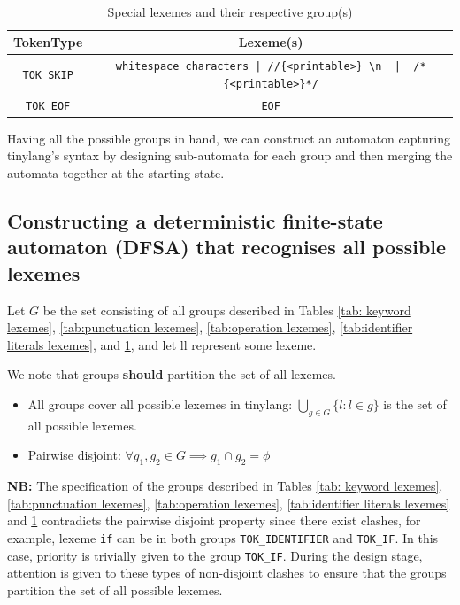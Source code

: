 \begin{itemize}
    \begin{table}[H]\
        \footnotesize
        \centering
        \begin{tabular}{c|c}
        TokenType & Lexeme(s) \\
        \hline 
           \verb!TOK_SKIP!  & \verb!whitespace characters | //{<printable>} \n  |  /*{<printable>}*/! \\
             \verb!TOK_EOF!  & \verb!EOF! 
        \end{tabular}
        \caption{Special lexemes and their respective group(s)}
        \label{tab:special lexemes}
    \end{table}   
\end{itemize}

Having all the possible groups in hand, we can construct an automaton capturing tinylang's syntax by designing sub-automata for each group and then merging the automata together at the starting state.

\subsection{Constructing a deterministic finite-state automaton (DFSA) that recognises all possible lexemes}

Let $G$ be the set consisting of all groups described in Tables \ref{tab: keyword lexemes}, \ref{tab:punctuation lexemes}, \ref{tab:operation lexemes}, \ref{tab:identifier literals lexemes}, and \ref{tab:special lexemes}, and let ll represent some lexeme.

\vskip 0.2in 



We note that groups \textbf{should} partition the set of all lexemes.

\begin{itemize}
    \item All groups cover all possible lexemes in tinylang: $  \bigcup\limits_{g \in G} \{  l  : l \in g  \}$ is the set of all possible lexemes.
    \item Pairwise disjoint: $\forall g_1,g_2 \in G \implies g_1 \cap g_2 = \phi$
\end{itemize}

\noindent\textbf{NB: } The specification of the groups described in Tables \ref{tab: keyword lexemes}, \ref{tab:punctuation lexemes}, \ref{tab:operation lexemes}, \ref{tab:identifier literals lexemes} and \ref{tab:special lexemes} contradicts the pairwise disjoint property since there exist clashes, for example, lexeme \verb!if!  can be in both groups \verb!TOK_IDENTIFIER! and \verb!TOK_IF!. In this case, priority is trivially given to the group \verb!TOK_IF!.  During the design stage, attention is given to these types of non-disjoint clashes to ensure that the groups partition the set of all possible lexemes.


